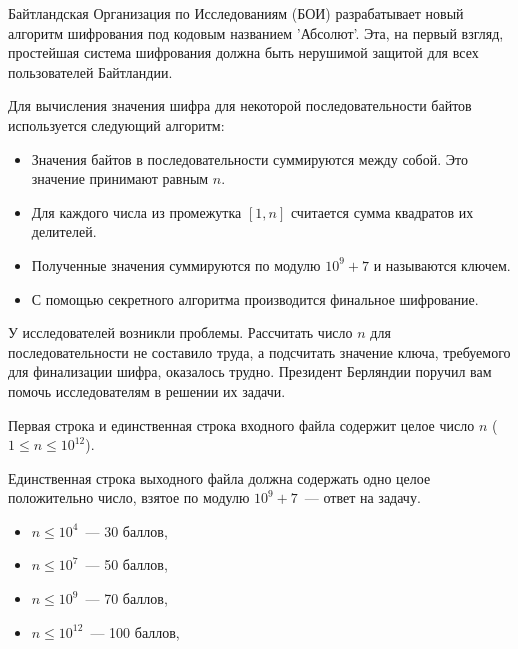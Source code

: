 
Байтландская Организация по Исследованиям (БОИ) разрабатывает новый алгоритм шифрования
под кодовым названием 'Абсолют'. Эта, на первый взгляд, простейшая система шифрования должна
быть нерушимой защитой для всех пользователей Байтландии.

Для вычисления значения шифра для некоторой последовательности байтов используется
следующий алгоритм:
\begin{itemize}
    \item Значения байтов в последовательности суммируются между собой. Это значение принимают равным $n$.
    \item Для каждого числа из промежутка $[1, n]$ считается сумма квадратов их делителей.
    \item Полученные значения суммируются по модулю $10^9 + 7$ и называются ключем.
    \item С помощью секретного алгоритма производится финальное шифрование.
\end{itemize}

У исследователей возникли проблемы. Рассчитать число $n$ для последовательности не составило
труда, а подсчитать значение ключа, требуемого для финализации шифра, оказалось трудно.
Президент Берляндии поручил вам помочь исследователям в решении их задачи.

\Input
Первая строка и единственная строка входного файла содержит целое число $n$ ($1 \le n \le 10^{12}$).

\Output
Единственная строка выходного файла должна содержать одно целое положительно число,
взятое по модулю $10^9 + 7$~--- ответ на задачу.

\Samples
\BeginTests
\EndTests

\Scoring
\begin{itemize}
	\item $n \le 10^4$~--- 30 баллов,
	\item $n \le 10^7$~--- 50 баллов,
	\item $n \le 10^9$~--- 70 баллов,
	\item $n \le 10^{12}$~--- 100 баллов,
\end{itemize}

\EndProblem
